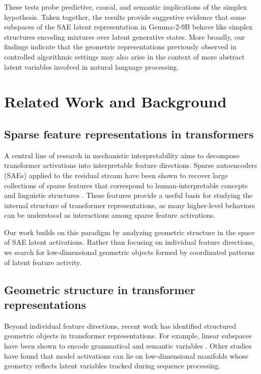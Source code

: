 \documentclass{article}
\begin{document}
These tests probe predictive, causal, and semantic implications of the simplex hypothesis. Taken together, the results
provide suggestive evidence that some subspaces of the SAE latent representation in Gemma-2-9B behave like simplex
structures encoding mixtures over latent generative states. More broadly, our findings indicate that the geometric
representations previously observed in controlled algorithmic settings may also arise in the context of more abstract
latent variables involved in natural language processing.

\section{Related Work and Background}
\label{sec:background}

\subsection{Sparse feature representations in transformers}

A central line of research in mechanistic interpretability aims to decompose transformer activations into interpretable feature
directions.  Sparse autoencoders (SAEs) applied to the residual stream have been shown to recover large collections of sparse features that
correspond to human-interpretable concepts and linguistic structures \citep{cunningham2023sparse, bricken2023monosemanticity}.  These
features provide a useful basis for studying the internal structure of transformer representations, as many higher-level behaviors can be
understood as interactions among sparse feature activations.

Our work builds on this paradigm by analyzing geometric structure in the space of SAE latent activations.  Rather than focusing on
individual feature directions, we search for low-dimensional geometric objects formed by coordinated patterns of latent feature activity.

\subsection{Geometric structure in transformer representations}

Beyond individual feature directions, recent work has identified structured geometric objects in transformer representations.  For
example, linear subspaces have been shown to encode grammatical and semantic variables \citep{gurnee2023language}.  Other studies have
found that model activations can lie on low-dimensional manifolds whose geometry reflects latent variables tracked during sequence
processing.
\end{document}
